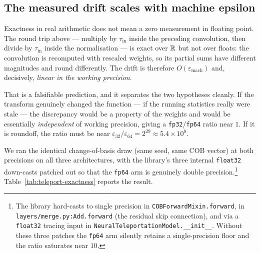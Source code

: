 \subsection{The measured drift scales with machine epsilon}
\label{app:teleport-eps}

Exactness in real arithmetic does not mean a zero measurement in floating point.
The round trip above --- multiply by $\tau_{\mathrm{in}}$ inside the preceding
convolution, then divide by $\tau_{\mathrm{in}}$ inside the normalisation --- is
exact over $\mathbb{R}$ but not over floats: the convolution is recomputed with rescaled
weights, so its partial sums have different magnitudes and round differently.
The drift is therefore $O(\varepsilon_{\mathrm{mach}})$ and, decisively,
\emph{linear in the working precision}.

That is a falsifiable prediction, and it separates the two hypotheses cleanly. If
the transform genuinely changed the function --- if the running statistics really
were stale --- the discrepancy would be a property of the weights and would be
essentially \emph{independent} of working precision, giving a
\texttt{fp32}/\texttt{fp64} ratio near $1$. If it is roundoff, the ratio must be
near $\varepsilon_{32}/\varepsilon_{64}=2^{29}\approx5.4\times10^{8}$.

We ran the identical change-of-basis draw (same seed, same COB vector) at both
precisions on all three architectures, with the library's three internal
\texttt{float32} down-casts patched out so that the \texttt{fp64} arm is
genuinely double precision.\footnote{The library hard-casts to single precision
in \texttt{COBForwardMixin.forward}, in \texttt{layers/merge.py:Add.forward} (the
residual skip connection), and via a \texttt{float32} tracing input in
\texttt{NeuralTeleportationModel.\_\_init\_\_}. Without these three patches the
\texttt{fp64} arm silently retains a single-precision floor and the ratio
saturates near $10$.} Table~\ref{tab:teleport-exactness} reports the result.

